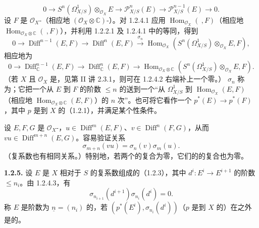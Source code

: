 \[0\longrightarrow S^n(\Omega^1_{X/S})\otimes_{\mathcal O_X}E\longrightarrow\mathcal P^n_{X/S}(E)\longrightarrow\mathcal P^{n-1}_{X/S}(E)\longrightarrow0.\tag{1.2.4.1}\]
设 $F$ 是 $\mathcal O_X$-（相应地 $(\mathcal O_X\otimes\mathbb C)$-）。对 1.2.4.1 应用 $\operatorname{Hom}_{\mathcal O_X}(\ ,F)$（相应地 $\operatorname{Hom}_{\mathcal O_X\otimes\mathbb C}(\ ,F)$），并利用 1.2.2.1 及 1.2.4.1 中的等同，得到
\[0\to\operatorname{Diff}^{n-1}(E,F)\to\operatorname{Diff}^{n}(E,F)\xrightarrow{\sigma_n}\operatorname{Hom}_{\mathcal O_X}(S^n(\Omega^1_{X/S})\otimes_{\mathcal O_X}E,F),\tag{1.2.4.2}\]
相应地为
\[0\to\operatorname{Diff}_{\mathbb C}^{n-1}(E,F)\to\operatorname{Diff}_{\mathbb C}^{n}(E,F)\to\operatorname{Hom}_{\mathcal O_X\otimes\mathbb C}(S^n(\Omega^1_{X/S})\otimes_{\mathcal O_X}E,F).\]
（若 $X$ 且 $\mathcal O_X$ 是，见第 II 讲 2.3.1，则可在 1.2.4.2 右端补上一个零。） $\sigma_n$ 称为；它把一个从 $E$ 到 $F$ 的阶数 $\leq n$ 的送到一个“从 $\Omega^1_{X/S}$ 到 $\operatorname{Hom}_{\mathcal O_X}(E,F)$（相应地 $\operatorname{Hom}_{\mathcal O_X\otimes\mathbb C}(E,F)$）的 $n$ 次”。也可将它看作一个 $p^*(E)\to p^*(F)$，其中 $p$ 是到 $X$ 的（1.2.1），并满足某个性条件。

设 $E,F,G$ 是 $\mathcal O_X$-，$u\in\operatorname{Diff}^m(E,F)$、$v\in\operatorname{Diff}^n(F,G)$，从而 $vu\in\operatorname{Diff}^{m+n}(E,G)$。容易验证关系
\[\sigma_{m+n}(vu)=\sigma_n(v)\sigma_m(u).\tag{1.2.4.3}\]
（复系数也有相同关系。）特别地，若两个的复合为零，它们的的复合也为零。

\textbf{1.2.5.} 设 $E$ 是 $X$ 相对于 $S$ 的复系数组成的（1.2.3），其中 $d^i:E^i\to E^{i+1}$ 的阶数 $\leq n_i$。由 1.2.4.3，有
\[\sigma_{n_{i+1}}(d^{i+1})\sigma_{n_i}(d^i)=0.\]
称 $E$ 是阶数为 $\underline n=(n_i)$ 的，若 $(p^*(E^i),\sigma_{n_i}(d^i))$（$p$ 是到 $X$ 的）在之外是的。

